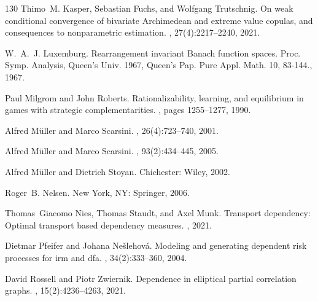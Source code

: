 \documentclass{article}
\begin{document}
\begin{thebibliography}{130}
    Thimo~M. Kasper, Sebastian Fuchs, and Wolfgang Trutschnig.
    \newblock On weak conditional convergence of bivariate {Archimedean} and
    extreme value copulas, and consequences to nonparametric estimation.
    , 27(4):2217--2240, 2021.

    W.~A.~J. Luxemburg.
    \newblock Rearrangement invariant {Banach} function spaces.
    \newblock Proc. {Symp}. {Analysis}, {Queen}'s {Univ}. 1967, {Queen}'s {Pap}.
      {Pure} {Appl}. {Math}. 10, 83-144., 1967.
    
    Paul Milgrom and John Roberts.
    \newblock Rationalizability, learning, and equilibrium in games with strategic
      complementarities.
    , pages
      1255--1277, 1990.
    
    Alfred {M\"uller} and Marco {Scarsini}.
    , 26(4):723--740, 2001.
    
    Alfred {M\"uller} and Marco {Scarsini}.
    , 93(2):434--445, 2005.
    
    Alfred {M\"uller} and Dietrich {Stoyan}.
    \newblock Chichester: Wiley, 2002.
    
    Roger~B. {Nelsen}.
    \newblock New York, NY: Springer, 2006.
    
    Thomas~Giacomo Nies, Thomas Staudt, and Axel Munk.
    \newblock Transport dependency: Optimal transport based dependency measures.
    , 2021.
    
    Dietmar Pfeifer and Johana Ne{\v{s}}lehov{\'a}.
    \newblock Modeling and generating dependent risk processes for irm and dfa.
    , 34(2):333--360, 2004.
    
    David Rossell and Piotr Zwiernik.
    \newblock Dependence in elliptical partial correlation graphs.
    , 15(2):4236--4263, 2021.
    

\end{thebibliography}
\end{document}
